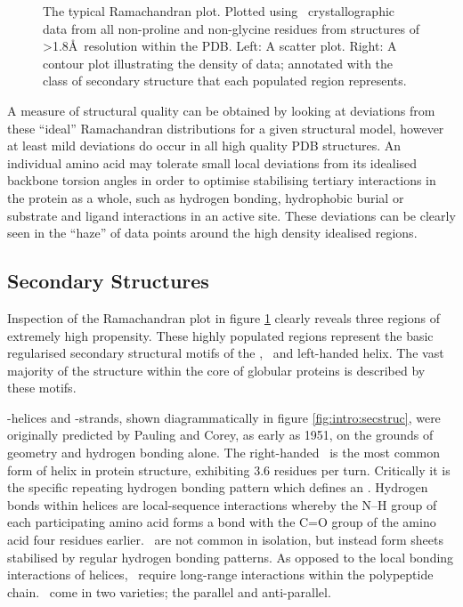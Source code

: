 \begin{figure}[hptb]
\begin{minipage}[b]{0.47\linewidth}
\end{minipage}
\caption[The typical Ramachandran plot]{The typical Ramachandran plot. Plotted using \xray\ crystallographic data from all non-proline and non-glycine residues from structures of \textgreater 1.8\AA\ resolution within the PDB. Left: A scatter plot. Right: A contour plot illustrating the density of data;  annotated with the class of secondary structure that each populated region represents. }
\label{fig:intro:ramachandran}
\end{figure}

A measure of structural quality can be obtained by looking at deviations from these ``ideal'' Ramachandran distributions for a given structural model, however at least mild deviations do occur in all high quality PDB structures. An individual amino acid may tolerate small local deviations from its idealised backbone torsion angles in order to optimise stabilising tertiary interactions in the protein as a whole, such as hydrogen bonding, hydrophobic burial or substrate and ligand interactions in an active site. These deviations can be clearly seen in the ``haze'' of data points around the high density idealised regions.






\subsection{Secondary Structures}

Inspection of the Ramachandran plot in figure \ref{fig:intro:ramachandran} clearly reveals three regions of extremely high propensity. These highly populated
regions represent the basic regularised secondary structural motifs of the
\ahelix, \bstrand\ and left-handed helix. The vast majority of the structure within the core of globular proteins  is described by these motifs. 


\al-helices\cite{NATIVE:Pauling1951:Helix} and \be-strands\cite{NATIVE:Pauling1951:Sheet}, shown diagrammatically in figure \ref{fig:intro:secstruc}, were originally predicted by Pauling and Corey, as early as 1951, on the grounds of geometry and hydrogen bonding alone.
The right-handed \ahelix\ is the most common form of helix in protein structure,
exhibiting 3.6 residues per turn. Critically it is the specific repeating
hydrogen bonding pattern which defines an \ahelix. Hydrogen bonds
within helices are local-sequence interactions whereby the N--H group of each participating amino acid forms a bond with the C=O group of the amino acid four residues earlier.
\bstrands\  are not  common in isolation, but instead form sheets stabilised by regular hydrogen bonding patterns. As opposed to the local bonding
interactions of helices, \bstrands\ require long-range interactions within
the polypeptide chain. \bsheets\ come in two varieties; the parallel and anti-parallel.


